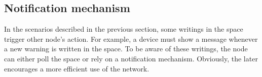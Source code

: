 \subsection{Notification mechanism}
\label{sec:notification}


In the scenarios described in the previous section, some writings in the space trigger other node's action.
For example, a device must show a message whenever a new warning is written in the space. %
To be aware of these writings, the node can either poll the space or rely on a notification mechanism. %
Obviously, the later encourages a more efficient use of the network. %

